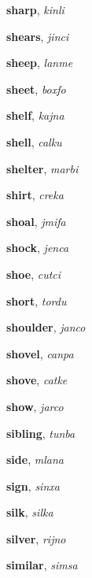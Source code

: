 \documentclass[12pt]{book}
\begin{document}
\begin{description}
\item[ ] \textbf{sharp}, \textit{kinli}

\item[ ] \textbf{shears}, \textit{jinci}

\item[ ] \textbf{sheep}, \textit{lanme}

\item[ ] \textbf{sheet}, \textit{boxfo}

\item[ ] \textbf{shelf}, \textit{kajna}

\item[ ] \textbf{shell}, \textit{calku}

\item[ ] \textbf{shelter}, \textit{marbi}

\item[ ] \textbf{shirt}, \textit{creka}

\item[ ] \textbf{shoal}, \textit{jmifa}

\item[ ] \textbf{shock}, \textit{jenca}

\item[ ] \textbf{shoe}, \textit{cutci}

\item[ ] \textbf{short}, \textit{tordu}

\item[ ] \textbf{shoulder}, \textit{janco}

\item[ ] \textbf{shovel}, \textit{canpa}

\item[ ] \textbf{shove}, \textit{catke}

\item[ ] \textbf{show}, \textit{jarco}

\item[ ] \textbf{sibling}, \textit{tunba}

\item[ ] \textbf{side}, \textit{mlana}

\item[ ] \textbf{sign}, \textit{sinxa}

\item[ ] \textbf{silk}, \textit{silka}

\item[ ] \textbf{silver}, \textit{rijno}

\item[ ] \textbf{similar}, \textit{simsa}


\end{description}
\end{document}
